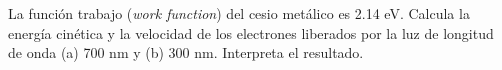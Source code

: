 \documentclass[addpoints,spanish, 12pt,a4paper]{exam}
\begin{document}
\begin{questions}
    \question[1] La función trabajo (\textit{work function})
    del cesio metálico es 2.14 eV. Calcula la energía 
    cinética y la velocidad de los electrones liberados
    por la luz de longitud de onda (a) 700 nm y (b) 300 nm.
    Interpreta el resultado.
    \newpage
%
    

\end{questions}
\end{document}

